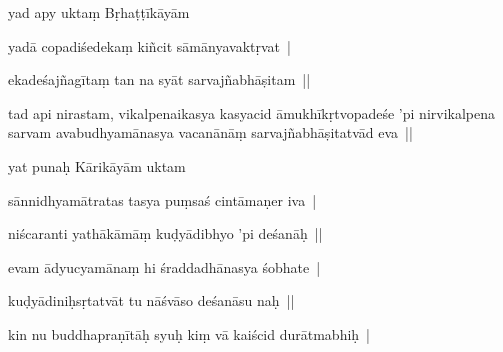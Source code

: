 \documentclass[article,12pt,a4paper]{memoir}%
\newcounter{parCount}
\begin{document}
	  \pstart \leavevmode%
	\label{thakur75-24.15}yad apy uktaṃ Bṛhaṭṭīkāyām 
	{}
	\pend%
      

	  \pstart \leavevmode%
	yadā copadiśedekaṃ kiñcit sāmānyavaktṛvat | 
	{}
	\pend%
      

	  \pstart \leavevmode%
	ekadeśajñagītaṃ tan na syāt sarvajñabhāṣitam ||
	{}
	\pend%
      

	  \pstart \leavevmode%
	tad api nirastam, vikalpenaikasya kasyacid āmukhīkṛtvopadeśe 'pi nirvikalpena sarvam avabudhyamānasya vacanānāṃ sarvajñabhāṣitatvād eva || 
	{}
	\pend%
      

	  \pstart \leavevmode%
	yat punaḥ Kārikāyām uktam 
	{}
	\pend%
      

	  \pstart \leavevmode%
	sānnidhyamātratas tasya puṃsaś cintāmaṇer iva | 
	{}
	\pend%
      

	  \pstart \leavevmode%
	niścaranti yathākāmāṃ kuḍyādibhyo 'pi deśanāḥ || 
	{}
	\pend%
      

	  \pstart \leavevmode%
	evam ādyucyamānaṃ hi śraddadhānasya śobhate | 
	{}
	\pend%
      

	  \pstart \leavevmode%
	kuḍyādiniḥsṛtatvāt tu nāśvāso deśanāsu naḥ || 
	{}
	\pend%
      

	  \pstart \leavevmode%
	kin nu buddhapraṇītāḥ syuḥ kiṃ vā kaiścid durātmabhiḥ | 
	{}
	\pend%
      
\end{document}

